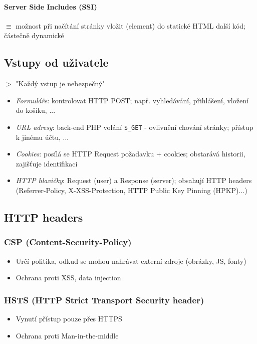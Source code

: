 \documentclass[10pt,a4paper]{article}
\begin{document}
\paragraph*{Server Side Includes (SSI)} $\equiv$ možnost při načítání stránky vložit (element) do statické HTML další kód; částečně dynamické


\subsection{Vstupy od uživatele}
$>$ "Každý vstup je nebezpečný"
\begin{itemize}
    \item \textit{Formuláře}: kontrolovat HTTP POST; např. vyhledávání, přihlášení, vložení do košíku, ...
    \item \textit{URL adresy}: back-end PHP volání \texttt{\$\_GET} - ovlivnění chování stránky;  přístup k jinému účtu, ...
    \item \textit{Cookies}: posílá se HTTP Request požadavku + cookies; obstarává historii, zajišťuje identifikaci
    \item \textit{HTTP hlavičky}: Request (user) a Response (server); obsahují HTTP headers (Referrer-Policy, X-XSS-Protection,  HTTP Public Key Pinning (HPKP)...)
\end{itemize}


\subsection{HTTP headers}

\subsubsection*{CSP (Content-Security-Policy)}
\begin{itemize}
    \item Určí politika, odkud se mohou nahrávat externí zdroje (obrázky, JS, fonty)
    \item Ochrana proti XSS, data injection
\end{itemize}

\subsubsection*{HSTS (HTTP Strict Transport Security header)}
\begin{itemize}
    \item Vynutí přístup pouze přes HTTPS
    \item Ochrana proti Man-in-the-middle
\end{itemize}
\end{document}
